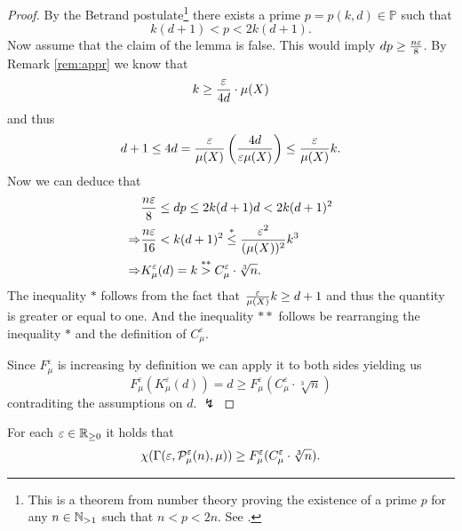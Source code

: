\begin{proof}
  By the Betrand postulate\footnote{This is a theorem from number theory proving the existence of a prime $p$ for any $n\in \N_{>1}$ such that $n < p < 2n$. See \cite{}.}
  there exists a prime $p = p(k,d) \in \mathbb{P}$ such that \[k(d+1) < p < 2k(d+1).\]
  Now assume that the claim of the lemma is false. This would imply $dp \geq {n\varepsilon \over 8}$. By Remark \ref{rem:appr} we know that \[k \geq {\varepsilon \over 4d} \cdot \mu(X)\] and thus
  \begin{equation*}
    d+1 \leq 4d = {\varepsilon \over \mu(X)}\left({4d \over \varepsilon \mu(X)}\right)\leq {\varepsilon \over \mu(X)} k. 
  \end{equation*}
  Now we can deduce that
  \begin{align*}
    &{n\varepsilon \over 8} \leq dp \leq 2k(d+1)d < 2k(d+1)^2 \\
    \Rightarrow & {n\varepsilon \over 16} < k(d+1)^2 \overset{*}{\leq} {\varepsilon^2\over (\mu(X))^2}k^3 \\
    \Rightarrow & K_\mu^\varepsilon(d) = k \overset{**}{>} C_\mu^\varepsilon\cdot \sqrt[3]{n}.
  \end{align*}
  The inequality $*$ follows from the fact that ${\varepsilon \over \mu(X)}k \geq d+1$ and thus the quantity is greater or equal to one. And the inequality $**$ follows be rearranging the inequality $*$ and the definition of $C_\mu^\varepsilon$.

  Since $F_\mu^\varepsilon$ is increasing by definition we can apply it to both sides yielding us
  \begin{equation*}
    F_\mu^\varepsilon(K_\mu^\varepsilon(d)) = d \geq F_\mu^\varepsilon(C_\mu^\varepsilon\cdot\sqrt[3]{n})
  \end{equation*}
  contraditing the assumptions on $d$. $\lightning$
\end{proof}

\begin{thm}\label{thm:gammain}
  For each $\varepsilon \in \R_{\geq 0}$ it holds that \[\chi(\Gamma(\varepsilon, \P^\varepsilon_\mu(n), \mu)) \geq F^\varepsilon_\mu(C^\varepsilon_\mu \cdot \sqrt[3]{n}).\]
\end{thm}

\newcommand{\h}{h_{m_q-1-q_0}}
\newcommand{\hh}{h_{m_q-q_0}}


